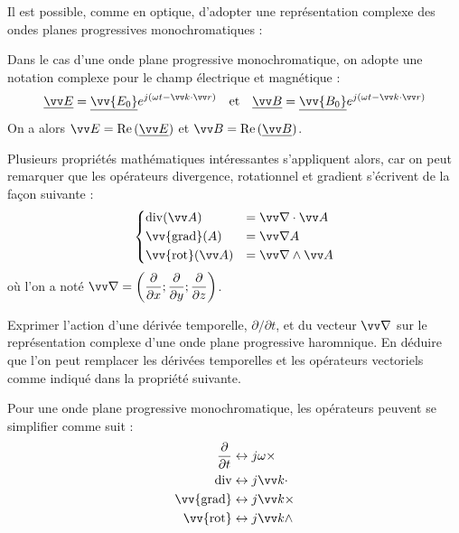 \documentclass[11pt,fleqn]{book} %
\renewcommand{\div}{\mathrm{div}}
\newcommand{\rot}{\vv{\mathrm{rot}}}
\renewcommand{\grad}{\vv{\mathrm{grad}}}
\begin{document}
Il est possible, comme en optique, d'adopter une représentation complexe des ondes planes progressives monochromatiques :
\begin{definition}
	Dans le cas d'une onde plane progressive monochromatique, on adopte une notation complexe pour le champ électrique et magnétique :
	\begin{equation}
		\underline{\vv E} = \underline{\vv{E_0}} e^{j(\omega t - \vv k \cdot \vv r)} \quad \mathrm{et} \quad \underline{\vv B} = \underline{\vv{B_0}} e^{j(\omega t - \vv k \cdot \vv r)}
	\end{equation}
	On a alors $\vv E = \Re\left(\underline{\vv E}\right)$ et $\vv B = \Re\left(\underline{\vv B}\right)$.
\end{definition}

Plusieurs propriétés mathématiques intéressantes s'appliquent alors, car on peut remarquer que les opérateurs divergence, rotationnel et gradient s'écrivent de la façon suivante :
\begin{equation}
	\begin{dcases}
		\div(\vv A) &= \vv \nabla \cdot \vv A \\
		\grad(A) &= \vv \nabla A \\
		\rot(\vv A) &= \vv \nabla \wedge \vv A
	\end{dcases}
\end{equation}
où l'on a noté $\vv \nabla = \left( \dfrac{\partial}{\partial x} ; \dfrac{\partial}{\partial y} ; \dfrac{\partial}{\partial z} \right)$.


\begin{capex}
	Exprimer l'action d'une dérivée temporelle, $\partial/\partial t$, et du vecteur $\vv \nabla$ sur le représentation complexe d'une onde plane progressive haromnique. En déduire que l'on peut remplacer les dérivées temporelles et les opérateurs vectoriels comme indiqué dans la propriété suivante.
\end{capex}

\begin{proposition}
	Pour une onde plane progressive monochromatique, les opérateurs peuvent se simplifier comme suit :
	\begin{align}
		\frac{\partial}{\partial t} &\leftrightarrow j \omega \times \\
		\div &\leftrightarrow j \vv k \cdot \\
		\grad &\leftrightarrow j \vv k \times\\
		\rot &\leftrightarrow j \vv k \wedge
	\end{align}
\end{proposition}
\end{document}
